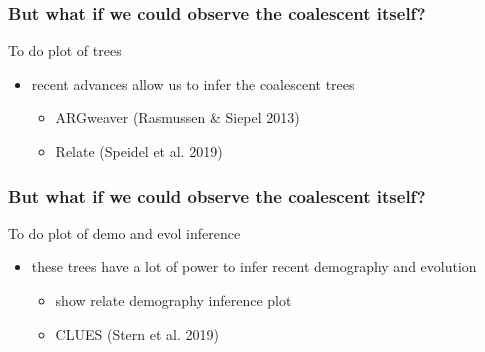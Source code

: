 \documentclass{beamer}
\begin{document}

\begin{frame}
	\frametitle{But what if we could observe the coalescent itself?}
	
	\begin{alertblock}{To do}
		plot of trees
	\end{alertblock}

	\begin{itemize}
		\item recent advances allow us to infer the coalescent trees \pause
		\begin{itemize}
			\item ARGweaver (Rasmussen \& Siepel 2013) \pause
			\item Relate (Speidel et al. 2019) \pause
		\end{itemize}
	\end{itemize}
		
\end{frame}


\begin{frame}
	\frametitle{But what if we could observe the coalescent itself?}
	
	\begin{alertblock}{To do}
		plot of demo and evol inference
	\end{alertblock}

	\begin{itemize}
		\item these trees have a lot of power to infer recent demography and evolution \pause
		\begin{itemize}
			\item show relate demography inference plot
			\item CLUES (Stern et al. 2019) \pause
		\end{itemize}
	\end{itemize}
		
\end{frame}
		
\end{document}
